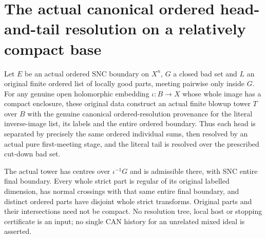 \section{The actual canonical ordered head-and-tail resolution on a relatively compact base}
\label{sec:hironaka-original-local-canonical-ordered-resolution}

\begin{theorem}
\label{hir:original-local-canonical-ordered-resolution-producer}
Let $E$ be an actual ordered SNC boundary on $X^n$, $G$ a closed bad
set and $L$ an original finite ordered list of locally good parts,
meeting pairwise only inside $G$. For any genuine open holomorphic
embedding $\iota:B\to X$ whose whole image has a compact enclosure,
these original data construct an actual finite blowup tower $T$ over
$B$ with the genuine canonical ordered-resolution provenance for the
literal inverse-image list, its labels and the entire ordered
boundary. Thus each head is separated by precisely the same ordered
individual sums, then resolved by an actual pure first-meeting stage,
and the literal tail is resolved over the prescribed cut-down bad set.

The actual tower has centres over $\iota^{-1}G$ and is admissible there,
with SNC entire final boundary. Every whole strict part is regular of
its original labelled dimension, has normal crossings with that same
entire final boundary, and distinct ordered parts have disjoint whole
strict transforms. Original parts and their intersections need not be
compact. No resolution tree, local host or stopping certificate is an
input; no single CAN history for an unrelated mixed ideal is asserted.
\leanok
\end{theorem}
